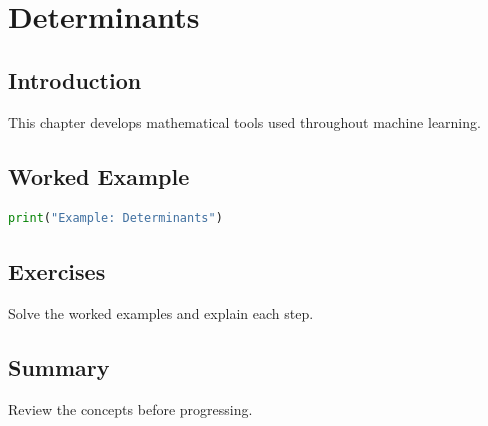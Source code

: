 \chapter{Determinants}
\label{chap:vol4-12}



\section{Introduction}
This chapter develops mathematical tools used throughout machine learning.

\section{Worked Example}
\begin{lstlisting}[language=Python]
print("Example: Determinants")
\end{lstlisting}

\section{Exercises}
\begin{exercise}
Solve the worked examples and explain each step.
\end{exercise}

\section{Summary}
Review the concepts before progressing.
